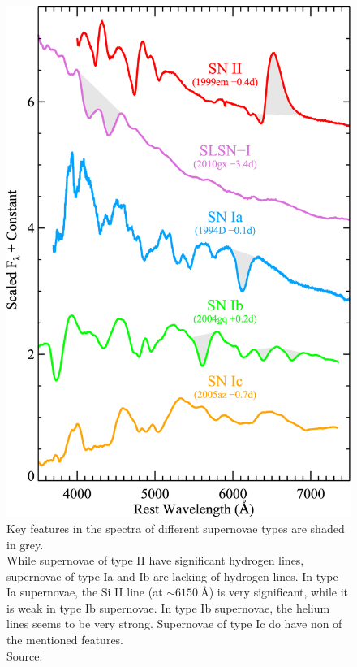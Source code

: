 \begin{figure}
    \begin{minipage}{7cm}
        \caption{Key features in the spectra of different supernovae types are shaded in grey. \\ 
            While supernovae of type II have significant hydrogen lines, supernovae of type Ia and Ib are lacking of hydrogen lines. In type Ia supernovae, the Si II line (at $\sim \SI{6150}{\angstrom}$) is very significant, while it is weak in type Ib supernovae. In type Ib supernovae, the helium lines seems to be very strong.
     Supernovae of type Ic do have non of the mentioned features. \\
Source: \cite[Figure 1]{Quimby2018}}
    \end{minipage}
    \hspace{1cm}
    \begin{minipage}{7cm}
        \includegraphics[scale=0.8]{figures/images/supernovae-spectra.jpg}
    \end{minipage}
\end{figure}

